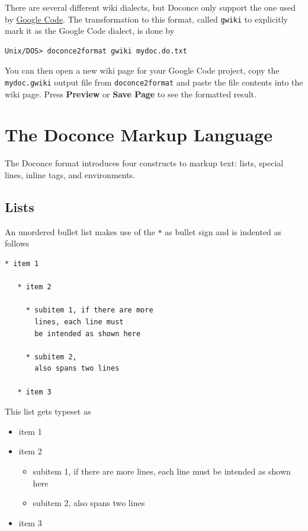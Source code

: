 \documentclass{article}
\begin{document}
There are several different wiki dialects, but Doconce only support the
one used by \href{http://code.google.com/p/support/wiki/WikiSyntax}{Google Code}.
The transformation to this format, called {\fontsize{10pt}{10pt}\verb!gwiki!} to explicitly mark
it as the Google Code dialect, is done by
\begin{Verbatim}[fontsize=\fontsize{9pt}{9pt},tabsize=8,baselinestretch=0.85,
fontfamily=tt,xleftmargin=7mm]
Unix/DOS> doconce2format gwiki mydoc.do.txt
\end{Verbatim}
\noindent
You can then open a new wiki page for your Google Code project, copy
the {\fontsize{10pt}{10pt}\verb!mydoc.gwiki!} output file from {\fontsize{10pt}{10pt}\verb!doconce2format!} and paste the
file contents into the wiki page. Press \textbf{Preview} or \textbf{Save Page} to
see the formatted result.


\section{The Doconce Markup Language}

The Doconce format introduces four constructs to markup text:
lists, special lines, inline tags, and environments.

\subsection{Lists}

An unordered bullet list makes use of the {\fontsize{10pt}{10pt}\verb!*!} as bullet sign
and is indented as follows
\begin{Verbatim}[fontsize=\fontsize{9pt}{9pt},tabsize=8,baselinestretch=0.85,
fontfamily=tt,xleftmargin=7mm]
   * item 1

   * item 2

     * subitem 1, if there are more
       lines, each line must
       be intended as shown here

     * subitem 2,
       also spans two lines

   * item 3
\end{Verbatim}
\noindent

This list gets typeset as

\begin{itemize}
   \item item 1

   \item item 2
\begin{itemize}

     \item subitem 1, if there are more
       lines, each line must
       be intended as shown here

     \item subitem 2,
       also spans two lines

\end{itemize}

\noindent
   \item item 3
\end{itemize}
\end{document}
